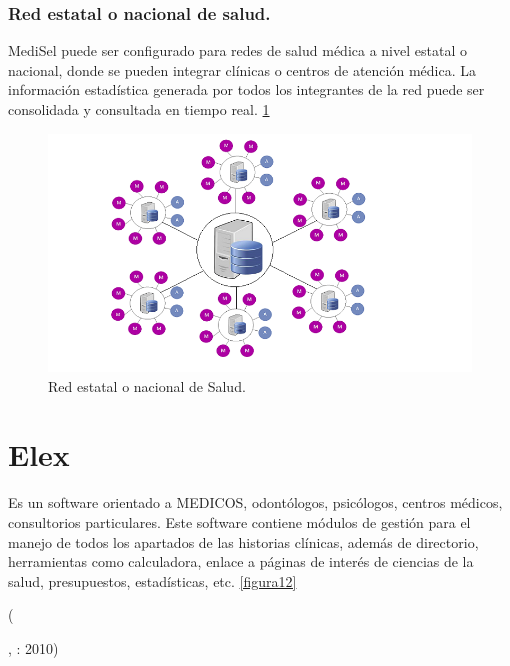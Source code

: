 \subsubsection{Red estatal o nacional de salud.}
MediSel puede ser configurado para redes de salud médica a nivel estatal o nacional, donde se pueden integrar clínicas o centros de atención médica. La información estadística generada por todos los integrantes de la red puede ser consolidada y consultada en tiempo real. \cite{esquemas} \ref{figura6}

\begin{figure}[h]
  \label{figura6}
  \centering
  \includegraphics[scale=.35]{lib/assets/6}
  \caption{Red estatal o nacional de Salud.}
\end{figure}







\section{Elex}
\begin{center}
  \begin{minipage}{0.9\linewidth}
    \vspace{5pt}%
    {\small
Es un software orientado a MEDICOS, odontólogos, psicólogos, centros médicos, consultorios particulares. Este software contiene módulos de gestión para el manejo de todos los apartados de las historias clínicas, además de directorio, herramientas como calculadora, enlace a páginas de interés de ciencias de la salud, presupuestos, estadísticas, etc. \ref{figura12}
    }
    \begin{flushright}
      (\author{Elex},
      : 2010)
    \end{flushright}
      \vspace{5pt}%
  \end{minipage}
\end{center}

